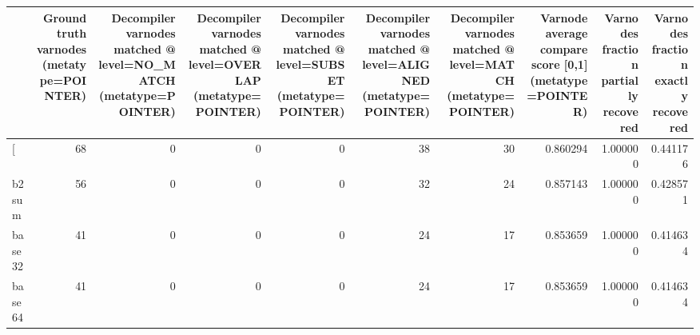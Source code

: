 \begin{tabular}{lrrrrrrrrr}
\toprule
{} &  Ground truth varnodes (metatype=POINTER) &  Decompiler varnodes matched @ level=NO\_MATCH (metatype=POINTER) &  Decompiler varnodes matched @ level=OVERLAP (metatype=POINTER) &  Decompiler varnodes matched @ level=SUBSET (metatype=POINTER) &  Decompiler varnodes matched @ level=ALIGNED (metatype=POINTER) &  Decompiler varnodes matched @ level=MATCH (metatype=POINTER) &  Varnode average compare score [0,1] (metatype=POINTER) &  Varnodes fraction partially recovered &  Varnodes fraction exactly recovered \\
\midrule
[         &                                        68 &                                                  0 &                                                  0 &                                                  0 &                                                 38 &                                                 30 &                                           0.860294 &                               1.000000 &                             0.441176 \\
b2sum     &                                        56 &                                                  0 &                                                  0 &                                                  0 &                                                 32 &                                                 24 &                                           0.857143 &                               1.000000 &                             0.428571 \\
base32    &                                        41 &                                                  0 &                                                  0 &                                                  0 &                                                 24 &                                                 17 &                                           0.853659 &                               1.000000 &                             0.414634 \\
base64    &                                        41 &                                                  0 &                                                  0 &                                                  0 &                                                 24 &                                                 17 &                                           0.853659 &                               1.000000 &                             0.414634 \\

\end{tabular}
